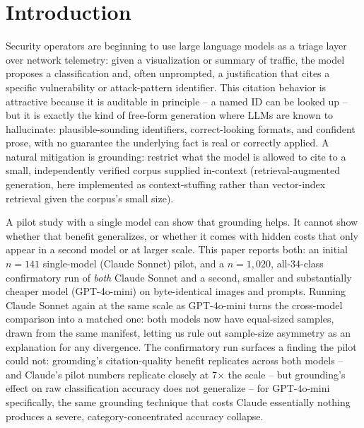 \documentclass[twocolumn]{svjour3}
\begin{document}
\section{Introduction}

Security operators are beginning to use large language models as a triage layer over network
telemetry: given a visualization or summary of traffic, the model proposes a classification and,
often unprompted, a justification that cites a specific vulnerability or attack-pattern
identifier. This citation behavior is attractive because it is auditable in principle -- a named
ID can be looked up -- but it is exactly the kind of free-form generation where LLMs are known to
hallucinate: plausible-sounding identifiers, correct-looking formats, and confident prose, with
no guarantee the underlying fact is real or correctly applied. A natural mitigation is grounding:
restrict what the model is allowed to cite to a small, independently verified corpus supplied
in-context (retrieval-augmented generation, here implemented as context-stuffing rather than
vector-index retrieval given the corpus's small size).

A pilot study with a single model can show that grounding helps. It cannot show whether that
benefit generalizes, or whether it comes with hidden costs that only appear in a second model or
at larger scale. This paper reports both: an initial $n=141$ single-model (Claude Sonnet) pilot,
and a $n=1{,}020$, all-34-class confirmatory run of \emph{both} Claude Sonnet and a second,
smaller and substantially cheaper model (GPT-4o-mini) on byte-identical images and prompts. Running
Claude Sonnet again at the same scale as GPT-4o-mini turns the cross-model comparison into a
matched one: both models now have equal-sized samples, drawn from the same manifest, letting us
rule out sample-size asymmetry as an explanation for any divergence. The confirmatory run surfaces
a finding the pilot could not: grounding's citation-quality benefit replicates across both models
-- and Claude's pilot numbers replicate closely at 7$\times$ the scale -- but grounding's effect
on raw classification accuracy does not generalize -- for GPT-4o-mini specifically, the same
grounding technique that costs Claude essentially nothing produces a severe, category-concentrated
accuracy collapse.
\end{document}
